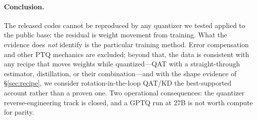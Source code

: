 \paragraph{Conclusion.}
The released codes cannot be reproduced by any quantizer we tested applied to
the public base: the residual is weight movement from training. What the
evidence does \emph{not} identify is the particular training method. Error
compensation and other PTQ mechanics are excluded; beyond that, the data is
consistent with any recipe that moves weights while quantized---QAT with a
straight-through estimator, distillation, or their combination---and with the
shape evidence of \S\ref{sec:recipe}, we consider rotation-in-the-loop
QAT/KD the best-supported account rather than a proven one. Two operational
consequences: the quantizer reverse-engineering track is closed, and a GPTQ
run at 27B is not worth compute for parity.
